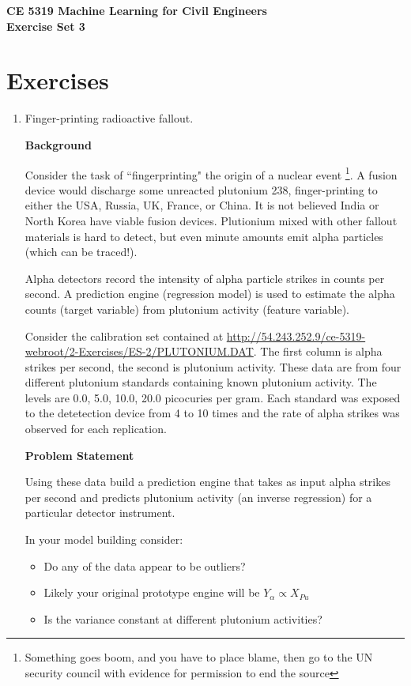\documentclass[12pt]{article}
\begin{document}
\begin{center}
{\textbf{{ CE 5319 Machine Learning for Civil Engineers} \\ {Exercise Set 3}}}
\end{center}

\section*{\small{Exercises}}
\begin{enumerate}
\item Finger-printing radioactive fallout.

\textbf{Background}

Consider the task of ``fingerprinting" the origin of a nuclear event \footnote{Something goes boom, and you have to place blame, then go to the UN security council with evidence for permission to end the source}. A fusion device would discharge some unreacted plutonium 238, finger-printing to either the USA, Russia, UK, France, or China. It is not believed India or North Korea have viable fusion devices. Plutionium mixed with other fallout materials is hard to detect, but even minute amounts emit alpha particles (which can be traced!).

Alpha detectors record the intensity of alpha particle strikes in counts per second. A prediction engine (regression model) is used to estimate the alpha counts (target variable) from plutonium activity (feature variable).

Consider the calibration set contained at \url{http://54.243.252.9/ce-5319-webroot/2-Exercises/ES-2/PLUTONIUM.DAT}.  The first column is alpha strikes per second, the second is plutonium activity. These data are from four different plutonium standards containing known plutonium activity. The levels are 0.0, 5.0, 10.0, 20.0 picocuries per gram.  Each standard was exposed to the detetection device from 4 to 10 times and the rate of alpha strikes was observed for each replication.

\textbf{Problem Statement}

Using these data build a prediction engine that takes as input alpha strikes per second and predicts plutonium activity (an inverse regression) for a particular detector instrument.  

In your model building consider:
\begin{itemize}
\item Do any of the data appear to be outliers?  
\item Likely your original prototype engine will be $Y_{\alpha} \propto X_{Pu}$
\item Is the variance constant at different plutonium activities?
\end{itemize}


\end{enumerate}
\end{document}
